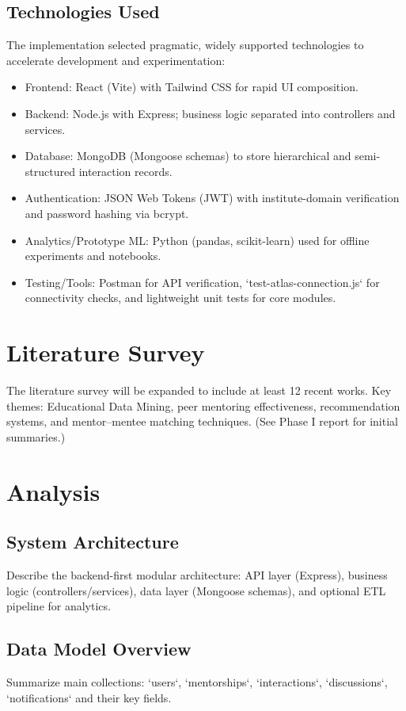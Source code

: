 \documentclass[12pt,singleside,a4paper]{article}
\begin{document}
\subsection{Technologies Used}
The implementation selected pragmatic, widely supported technologies to accelerate development and experimentation:
\begin{itemize}
  \item Frontend: React (Vite) with Tailwind CSS for rapid UI composition.
  \item Backend: Node.js with Express; business logic separated into controllers and services.
  \item Database: MongoDB (Mongoose schemas) to store hierarchical and semi-structured interaction records.
  \item Authentication: JSON Web Tokens (JWT) with institute-domain verification and password hashing via bcrypt.
  \item Analytics/Prototype ML: Python (pandas, scikit-learn) used for offline experiments and notebooks.
  \item Testing/Tools: Postman for API verification, `test-atlas-connection.js` for connectivity checks, and lightweight unit tests for core modules.
\end{itemize}

\newpage

\section{Literature Survey}
The literature survey will be expanded to include at least 12 recent works. Key themes: Educational Data Mining, peer mentoring effectiveness, recommendation systems, and mentor–mentee matching techniques. (See Phase I report for initial summaries.)

\newpage

\section{Analysis}
\subsection{System Architecture}
Describe the backend-first modular architecture: API layer (Express), business logic (controllers/services), data layer (Mongoose schemas), and optional ETL pipeline for analytics.

\subsection{Data Model Overview}
Summarize main collections: `users`, `mentorships`, `interactions`, `discussions`, `notifications` and their key fields.
\end{document}
